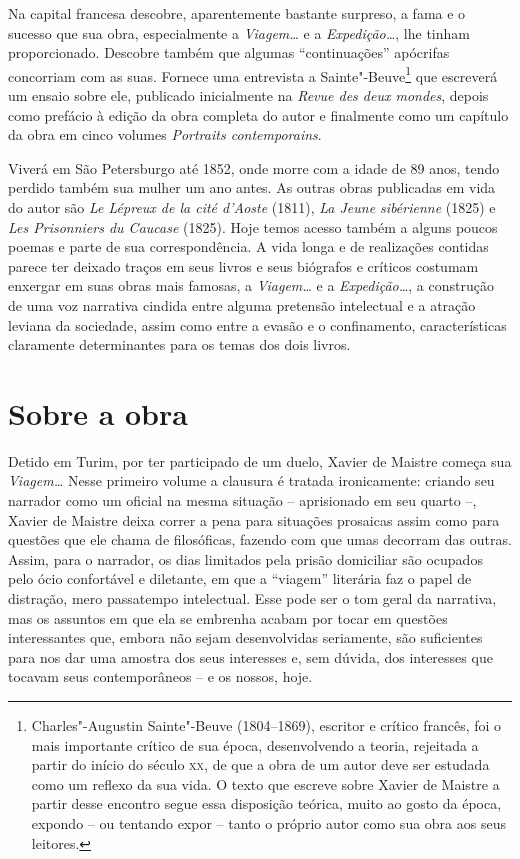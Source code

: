 Na capital francesa descobre, aparentemente bastante surpreso, a fama e
o sucesso que sua obra, especialmente a \textit{Viagem\ldots} e a
\textit{Expedição\ldots}, lhe tinham proporcionado. Descobre também que
algumas ``continuações'' apócrifas concorriam com as suas. Fornece uma
entrevista a Sainte"-Beuve\footnote{ Charles"-Augustin Sainte"-Beuve
(1804--1869), escritor e crítico francês, foi o mais importante crítico
de sua época, desenvolvendo a teoria, rejeitada a partir do início do
século \textsc{xx}, de que a obra de um autor deve ser estudada como um reflexo
da sua vida. O texto que escreve sobre Xavier de Maistre a partir desse
encontro segue essa disposição teórica, muito ao gosto da época,
expondo -- ou tentando expor -- tanto o próprio autor como sua obra aos
seus leitores.} que escreverá um ensaio sobre ele, publicado
inicialmente na \textit{Revue des deux mondes}, depois como prefácio à
edição da obra completa do autor e finalmente como um capítulo da obra
em cinco volumes \textit{Portraits contemporains}. 

Viverá em São Petersburgo até 1852, onde morre com a idade de 89 anos,
tendo perdido também sua mulher um ano antes. As outras obras publicadas 
em vida do autor são \textit{Le Lépreux de la cité d’Aoste} (1811), \textit{La Jeune sibérienne} 
(1825) e \textit{Les Prisonniers du Caucase} (1825). Hoje temos acesso também a alguns 
poucos poemas e parte de sua correspondência.  
A vida longa e de realizações contidas parece ter deixado traços em seus
livros e seus biógrafos e críticos costumam enxergar em suas obras mais
famosas, a \textit{Viagem\ldots} e a \textit{Expedição\ldots}, a construção
de uma voz narrativa cindida entre alguma pretensão intelectual e a
atração leviana da sociedade, assim como entre a evasão e o
confinamento, características claramente determinantes para os temas
dos dois livros. 

\section{Sobre a obra}

Detido em Turim, por ter participado de um duelo, Xavier de Maistre
começa sua \textit{Viagem\ldots} Nesse primeiro volume a clausura é
tratada ironicamente: criando seu narrador como um oficial na mesma
situação -- aprisionado em seu quarto --, Xavier de Maistre deixa
correr a pena para situações prosaicas assim como para questões que ele
chama de filosóficas, fazendo com que umas decorram das outras. Assim,
para o narrador, os dias limitados pela prisão domiciliar são ocupados
pelo ócio confortável e diletante, em que a ``viagem'' literária faz o
papel de distração, mero passatempo intelectual. Esse pode ser o tom
geral da narrativa, mas os assuntos em que ela se embrenha acabam por
tocar em questões interessantes que, embora não sejam desenvolvidas
seriamente, são suficientes para nos dar uma amostra dos seus
interesses e, sem dúvida, dos interesses que tocavam seus
contemporâneos -- e os nossos, hoje. 

